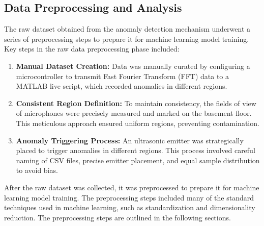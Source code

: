 \documentclass[conference]{IEEEtran}
\begin{document}
\subsection{Data Preprocessing and Analysis}
The raw dataset obtained from the anomaly detection mechanism underwent a series of preprocessing steps to prepare it for machine learning model training. Key steps in the raw data preprocessing phase included:

\begin{enumerate}
  \item \textbf{Manual Dataset Creation:} Data was manually curated by configuring a microcontroller to transmit Fast Fourier Transform (FFT) data to a MATLAB live script, which recorded anomalies in different regions.

  \item \textbf{Consistent Region Definition:} To maintain consistency, the fields of view of microphones were precisely measured and marked on the basement floor. This meticulous approach ensured uniform regions, preventing contamination.

  \item \textbf{Anomaly Triggering Process:} An ultrasonic emitter was strategically placed to trigger anomalies in different regions. This process involved careful naming of CSV files, precise emitter placement, and equal sample distribution to avoid bias.
\end{enumerate}

After the raw dataset was collected, it was preprocessed to prepare it for machine learning model training. The preprocessing steps included many of the standard techniques used in machine learning, such as standardization and dimensionality reduction. The preprocessing steps are outlined in the following sections.
\end{document}
